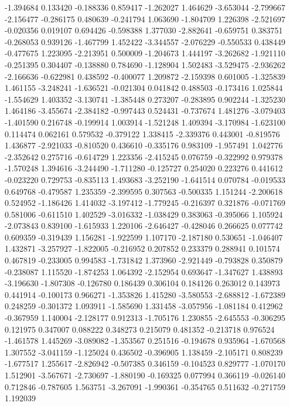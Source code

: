 -1.394684
0.133420
-0.188336
0.859417
-1.262027
1.464629
-3.653044
-2.799667
-2.156477
-0.286175
0.480639
-0.241794
1.063690
-1.804709
1.226398
-2.521697
-0.020356
0.019107
0.694426
-0.598388
1.377030
-2.882641
-0.659751
0.383751
-0.268053
0.939126
-1.467799
1.452422
-3.344557
-2.076229
-0.550533
0.438449
-0.477675
1.223095
-2.213951
0.500009
-1.204673
1.444197
-3.262682
-1.921110
-0.251395
0.304407
-0.138880
0.784690
-1.128904
1.502483
-3.529475
-2.936262
-2.166636
-0.622981
0.438592
-0.400077
1.209872
-2.159398
0.601005
-1.325839
1.461155
-3.248241
-1.636521
-0.021304
0.041842
0.488503
-0.173416
1.025844
-1.554629
1.403352
-3.130741
-1.385448
0.273207
-0.283895
0.902244
-1.325230
1.464186
-3.455674
-2.384182
-0.997443
0.524431
-0.737674
1.481276
-3.079403
-1.401590
0.216748
-0.199914
1.003914
-1.521248
1.409394
-3.170984
-1.623100
0.114474
0.062161
0.579532
-0.379122
1.338415
-2.339376
0.443001
-0.819576
1.436877
-2.921033
-0.810520
0.436610
-0.335176
0.983109
-1.957491
1.042776
-2.352642
0.275716
-0.614729
1.223356
-2.415245
0.076759
-0.322992
0.979378
-1.570248
1.394616
-3.244490
-1.711280
-0.125727
0.254020
0.223276
0.441612
-0.023220
0.729753
-0.835113
1.493683
-3.252190
-1.641514
0.070784
-0.019533
0.649768
-0.479587
1.235359
-2.399595
0.307563
-0.500335
1.151244
-2.200618
0.524952
-1.186426
1.414032
-3.197412
-1.779245
-0.216397
0.321876
-0.071769
0.581006
-0.611510
1.402529
-3.016332
-1.038429
0.383063
-0.395066
1.105924
-2.073843
0.839100
-1.615933
1.220106
-2.646427
-0.428046
0.266625
0.077742
0.609359
-0.319439
1.156281
-1.922599
1.107170
-2.187180
0.530651
-1.046407
1.432871
-3.257927
-1.822005
-0.216952
0.207852
0.233379
0.288941
0.101574
0.467819
-0.233005
0.994583
-1.731842
1.373960
-2.921449
-0.793828
0.350879
-0.238087
1.115520
-1.874253
1.064392
-2.152954
0.693647
-1.347627
1.438893
-3.196630
-1.807308
-0.126780
0.186439
0.306104
0.184126
0.263012
0.143973
0.441914
-0.100173
0.966271
-1.353826
1.415280
-3.580553
-2.688812
-1.672389
0.248259
-0.301372
1.093911
-1.585690
1.331458
-3.057956
-1.081184
0.412962
-0.367959
1.140004
-2.128177
0.912313
-1.705176
1.230855
-2.645553
-0.306295
0.121975
0.347007
0.088222
0.348273
0.215079
0.481352
-0.213718
0.976524
-1.461578
1.445269
-3.089082
-1.353567
0.251516
-0.194678
0.935964
-1.670568
1.307552
-3.041159
-1.125024
0.436502
-0.396905
1.138459
-2.105171
0.808239
-1.677517
1.255617
-2.826942
-0.507385
0.346159
-0.104523
0.829777
-1.070170
1.512901
-3.567671
-2.730697
-1.880190
-0.169325
0.077994
0.366119
-0.026140
0.712846
-0.787605
1.563751
-3.267091
-1.990361
-0.354765
0.511632
-0.271759
1.192039
